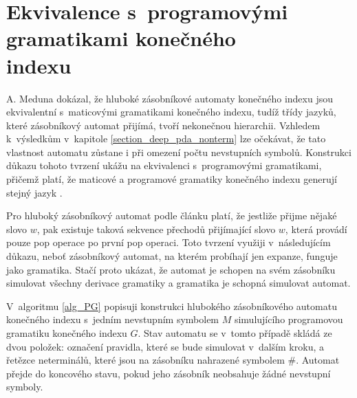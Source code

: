\section{Ekvivalence s~programovými gramatikami konečného\\indexu}

A. Meduna \cite{Meduna:FinitelyDeepPDA} dokázal, že hluboké zásobníkové automaty konečného indexu jsou ekvivalentní s~maticovými gramatikami konečného indexu, tudíž třídy jazyků, které zásobníkový automat přijímá, tvoří nekonečnou hierarchii. Vzhledem k~výsledkům v~kapitole \ref{section_deep_pda_nonterm} lze očekávat, že tato vlastnost automatu zůstane i při omezení počtu nevstupních symbolů. Konstrukci důkazu tohoto tvrzení ukážu na ekvivalenci s~programovými gramatikami, přičemž platí, že maticové a programové gramatiky konečného indexu generují stejný jazyk \cite{Dassow:RegulatedRewriting}.

Pro hluboký zásobníkový automat podle článku \cite{Meduna:FinitelyDeepPDA} platí, že jestliže přijme nějaké slovo $w$, pak existuje taková sekvence přechodů přijímající slovo $w$, která provádí pouze pop operace po první pop operaci. Toto tvrzení využiji v~následujícím důkazu, neboť zásobníkový automat, na kterém probíhají jen expanze, funguje jako gramatika. Stačí proto ukázat, že automat je schopen na svém zásobníku simulovat všechny derivace gramatiky a gramatika je schopná simulovat automat.

V~algoritmu \ref{alg_PG} popisuji konstrukci hlubokého zásobníkového automatu konečného indexu s~jedním nevstupním symbolem $M$ simulujícího programovou gramatiku konečného indexu $G$. Stav automatu se v~tomto případě skládá ze dvou položek: označení pravidla, které se bude simulovat v~dalším kroku, a řetězce neterminálů, které jsou na zásobníku nahrazené symbolem $\#$. Automat přejde do koncového stavu, pokud jeho zásobník neobsahuje žádné nevstupní symboly.

